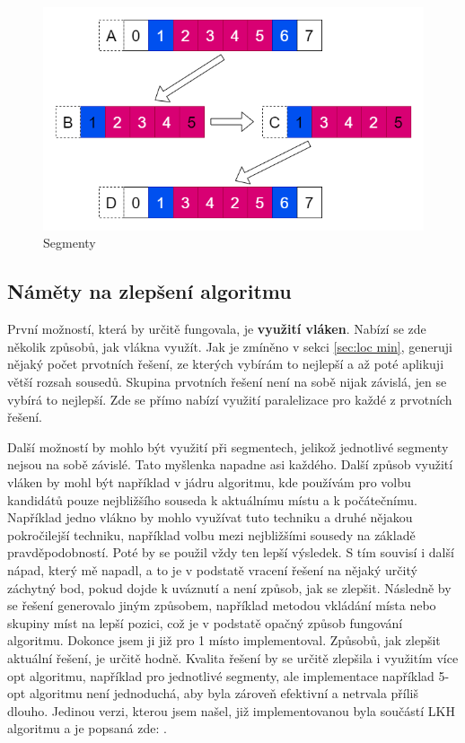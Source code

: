 \begin{figure}[H]
\includegraphics[width=15cm]{obrazky-figures/segments.png}
\caption{Segmenty}
\label{fig:Segments}
\end{figure}

\subsection{Náměty na zlepšení algoritmu}
První možností, která by určitě fungovala, je \textbf{využití vláken}. Nabízí se zde několik způsobů, jak vlákna využít. Jak je zmíněno v sekci \ref{sec:loc min}, generuji nějaký počet prvotních řešení, ze kterých vybírám to nejlepší a až poté aplikuji větší rozsah sousedů. Skupina prvotních řešení není na sobě nijak závislá, jen se vybírá to nejlepší. Zde se přímo nabízí využití paralelizace pro každé z prvotních řešení.

Další možností by mohlo být využití při segmentech, jelikož jednotlivé segmenty nejsou na sobě závislé. Tato myšlenka napadne asi každého. Další způsob využití vláken by mohl být například v jádru algoritmu, kde používám pro volbu kandidátů pouze nejbližšího souseda k aktuálnímu místu a k počátečnímu. Například jedno vlákno by mohlo využívat tuto techniku a druhé nějakou pokročilejší techniku, například volbu mezi nejbližšími sousedy na základě pravděpodobností. Poté by se použil vždy ten lepší výsledek. S tím souvisí i další nápad, který mě napadl, a to je v podstatě vracení řešení na nějaký určitý záchytný bod, pokud dojde k uváznutí a není způsob, jak se zlepšit. Následně by se řešení generovalo jiným způsobem, například metodou vkládání místa nebo skupiny míst na lepší pozici, což je v podstatě opačný způsob fungování algoritmu. Dokonce jsem ji již pro 1 místo implementoval. Způsobů, jak zlepšit aktuální řešení, je určitě hodně. Kvalita řešení by se určitě zlepšila i využitím více opt algoritmu, například pro jednotlivé segmenty, ale implementace například 5-opt algoritmu není jednoduchá, aby byla zároveň efektivní a netrvala příliš dlouho. Jedinou verzi, kterou jsem našel, již implementovanou byla součástí LKH algoritmu a je popsaná zde: \cite{helsgaunkopt}.







